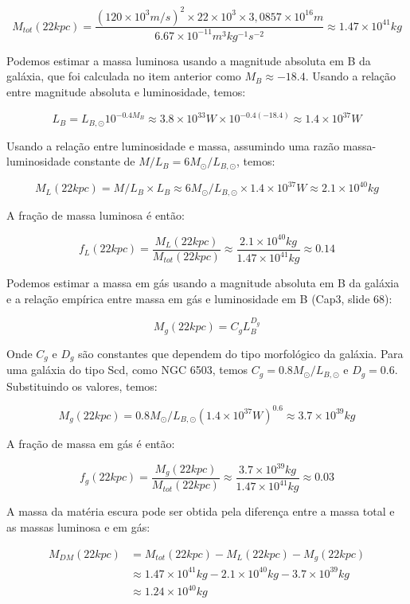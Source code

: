 \documentclass[a4paper,12pt]{article}
\begin{document}
\begin{enumerate}
\begin{enumerate}
$$M_{tot}(22 kpc) = \frac{(120 \times 10^3 m/s)^2 \times 22 \times 10^3 \times 3,0857 \times 10^{16} m}{6.67 \times 10^{-11} m^3 kg^{-1} s^{-2}} \approx 1.47 \times 10^{41} kg$$

Podemos estimar a massa luminosa usando a magnitude absoluta em B da galáxia, que foi calculada no item anterior como $M_B \approx -18.4$. Usando a relação entre magnitude absoluta e luminosidade, temos:

$$L_B = L_{B,\odot} 10^{-0.4 M_B} \approx 3.8 \times 10^{33} W \times 10^{-0.4 (-18.4)} \approx 1.4 \times 10^{37} W$$

Usando a relação entre luminosidade e massa, assumindo uma razão massa-luminosidade constante de $M/L_B = 6 M_{\odot}/L_{B,\odot}$, temos:

$$M_L(22 kpc) = M/L_B \times L_B \approx 6 M_{\odot}/L_{B,\odot} \times 1.4 \times 10^{37} W \approx 2.1 \times 10^{40} kg$$

A fração de massa luminosa é então:

$$f_L(22 kpc) = \frac{M_L(22 kpc)}{M_{tot}(22 kpc)} \approx \frac{2.1 \times 10^{40} kg}{1.47 \times 10^{41} kg} \approx 0.14$$

Podemos estimar a massa em gás usando a magnitude absoluta em B da galáxia e a relação empírica entre massa em gás e luminosidade em B (Cap3, slide 68):

$$M_g(22 kpc) = C_g L_B^{D_g}$$

Onde $C_g$ e $D_g$ são constantes que dependem do tipo morfológico da galáxia. Para uma galáxia do tipo Scd, como NGC 6503, temos $C_g = 0.8 M_{\odot}/L_{B,\odot}$ e $D_g = 0.6$. Substituindo os valores, temos:

$$M_g(22 kpc) = 0.8 M_{\odot}/L_{B,\odot} (1.4 \times 10^{37} W)^{0.6} \approx 3.7 \times 10^{39} kg$$

A fração de massa em gás é então:

$$f_g(22 kpc) = \frac{M_g(22 kpc)}{M_{tot}(22 kpc)} \approx \frac{3.7 \times 10^{39} kg}{1.47 \times 10^{41} kg} \approx 0.03$$

A massa da matéria escura pode ser obtida pela diferença entre a massa total e as massas luminosa e em gás:

\begin{align*}
M_{DM}(22 kpc) &= M_{tot}(22 kpc) - M_L(22 kpc) - M_g(22 kpc) \\ &\approx 1.47 \times 10^{41} kg - 2.1 \times 10^{40} kg -3.7 \times 10^{39} kg \\ &\approx 1.24 \times 10^{40} kg
\end{align*}


\end{enumerate}
\end{enumerate}
\end{document}
